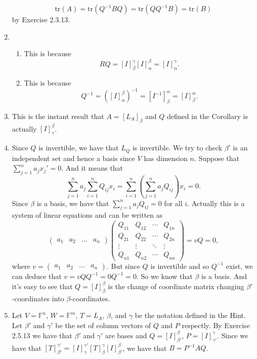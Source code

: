 \begin{enumerate}
\[\mathrm{tr}(A)=\mathrm{tr}(Q^{-1}BQ)=\mathrm{tr}(QQ^{-1}B)=\mathrm{tr}(B)\]
by  Exercise 2.3.13.
\item \begin{enumerate}
\item This is because 
\[RQ=[I]_{\beta}^{\gamma}[I]_{\alpha}^{\beta}=[I]_{\alpha}^{\gamma}.\]
\item This is because 
\[Q^{-1}=([I]_{\alpha}^{\beta})^{-1}=[I^{-1}]_{\beta}^{\alpha}=[I]_{\beta}^{\alpha}.\]
\end{enumerate}
\item This is the instant result that $A=[L_A]_{\beta}$ and $Q$ defined in the Corollary is actually $[I]_{\gamma}^{\beta}$.
\item Since $Q$ is invertible, we have that $L_Q$ is invertible. We try to check $\beta'$ is an independent set and hence a basis since $V$ has dimension $n$. Suppose that $\sum_{j=1}^n{a_jx_j'}=0$. And it means that 
\[\sum_{j=1}^n{a_j\sum_{i=1}^n{Q_{ij}x_i}}=\sum_{i=1}^n{(\sum_{j=1}^n{a_jQ_{ij}})x_i}=0.\]
Since $\beta $ is a basis, we have that $\sum_{j=1}^n{a_jQ_{ij}}=0$ for all $i$. Actually this is a system of linear equations and can be written as 
\[\left(\begin{array}{cccc}a_1&a_2&\ldots &a_n\end{array}\right)\left(\begin{array}{cccc}Q_{11}&Q_{12}&\cdots &Q_{1n}\\Q_{21}&Q_{22}&\cdots &Q_{2n}\\\vdots &\vdots &\ddots &\vdots \\Q_{n1}&Q_{n2}&\cdots &Q_{nn}\end{array}\right)=vQ=0,\]
where $v=\left(\begin{array}{cccc}a_1&a_2&\ldots &a_n\end{array}\right)$.
But since $Q$ is invertible and so $Q^{-1}$ exist, we can deduce that $v=vQQ^{-1}=0Q^{-1}=0$. So we know that $\beta $ is a basis. And it's easy to see that $Q=[I]_{\beta}^{\beta}$ is the change of coordinate matrix changing $\beta'$-coordinates into $\beta$-coordinates.
\item Let $V=\mathbb{F}^n$, $W=\mathbb{F}^m$, $T=L_A$, $\beta $, and $\gamma $ be the notation defined in the Hint. Let $\beta'$ and $\gamma'$ be the set of column vectors of $Q$ and $P$ respectly. By Exercise 2.5.13 we have that $\beta'$ and $\gamma'$ are bases and $Q=[I]_{\beta'}^{\beta}$, $P=[I]_{\gamma'}^{\gamma}$. Since we have that $[T]_{\beta'}^{\gamma'}=[I]_{\gamma}^{\gamma'}[T]_{\beta}^{\gamma}[I]_{\beta'}^{\beta}$, we have that $B=P^{-1}AQ$.
\end{enumerate}
